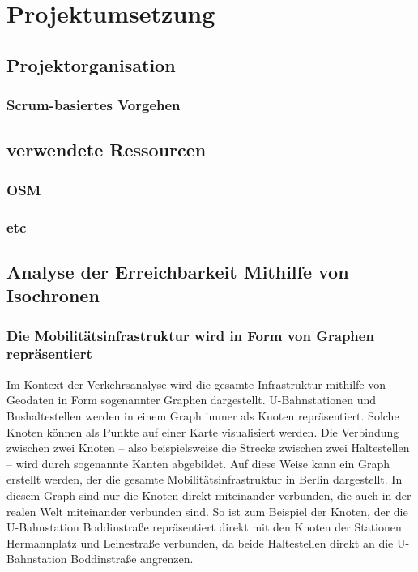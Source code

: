 \newpage
\section{Projektumsetzung} \label{projektumsetzung}

\subsection{Projektorganisation}
\subsubsection{Scrum-basiertes Vorgehen}

\subsection{verwendete Ressourcen}
\subsubsection{OSM}
\subsubsection{etc}

\subsection{Analyse der Erreichbarkeit Mithilfe von Isochronen}
\subsubsection{Die Mobilitätsinfrastruktur wird in Form von Graphen repräsentiert}

Im Kontext der Verkehrsanalyse wird die gesamte Infrastruktur mithilfe von Geodaten in Form sogenannter Graphen dargestellt. U-Bahnstationen und Bushaltestellen werden in einem Graph immer als Knoten repräsentiert. Solche Knoten können als Punkte auf einer Karte visualisiert werden. Die Verbindung zwischen zwei Knoten – also beispielsweise die Strecke zwischen zwei Haltestellen – wird durch sogenannte Kanten abgebildet. Auf diese Weise kann ein Graph erstellt werden, der die gesamte Mobilitätsinfrastruktur in Berlin dargestellt. In diesem Graph sind nur die Knoten direkt miteinander verbunden, die auch in der realen Welt miteinander verbunden sind. So ist zum Beispiel der Knoten, der die U-Bahnstation Boddinstraße repräsentiert direkt mit den Knoten der Stationen Hermannplatz und Leinestraße verbunden, da beide Haltestellen direkt an die U-Bahnstation Boddinstraße angrenzen.

